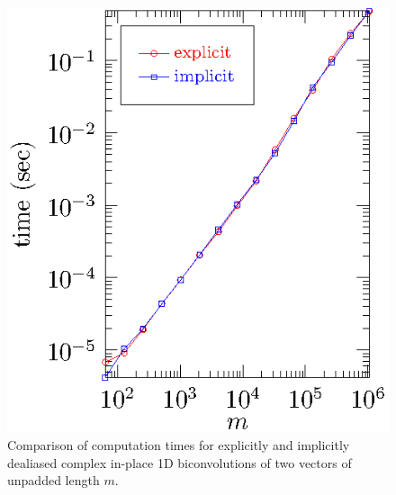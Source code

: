 \documentclass[final]{siamltex}
\begin{document}
\begin{figure}[htbp]
\begin{center}
\begin{minipage}{0.5\linewidth}
\begin{center}
\includegraphics{timing1b}
\caption{Comparison of computation times for explicitly and implicitly
dealiased complex in-place 1D biconvolutions of two vectors of
unpadded length $m$.}
\label{timing1b}
\end{center}
\end{minipage}
%
\begin{minipage}{0.49\linewidth}
\begin{center}

\end{center}
\end{minipage}
\end{center}
\end{figure}
\end{document}
